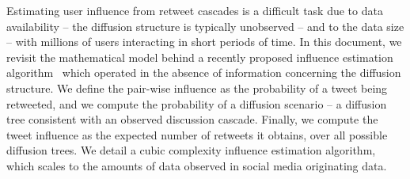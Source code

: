 %
Estimating user influence from retweet cascades is a difficult task due to data availability -- the diffusion structure is typically unobserved -- and to the data size -- with millions of users interacting in short periods of time.
In this document, we revisit the mathematical model behind a recently proposed influence estimation algorithm~\citep{Rizoiu2018a} which operated in the absence of information concerning the diffusion structure.
We define the pair-wise influence as the probability of a tweet being retweeted, and we compute the probability of a diffusion scenario -- a diffusion tree consistent with an observed discussion cascade.
Finally, we compute the tweet influence as the expected number of retweets it obtains, over all possible diffusion trees.
We detail a cubic complexity influence estimation algorithm, which scales to the amounts of data observed in social media originating data.